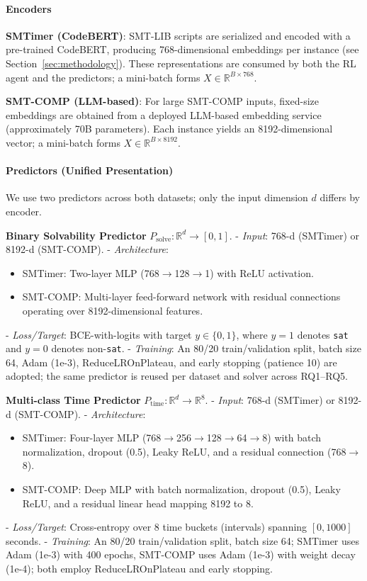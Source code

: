 \documentclass[acmsmall,screen,review,anonymous]{acmart}
\begin{document}
\paragraph{Encoders}
\textbf{SMTimer (CodeBERT)}: SMT-LIB scripts are serialized and encoded with a pre-trained CodeBERT, producing 768-dimensional embeddings per instance (see Section~\ref{sec:methodology}). These representations are consumed by both the RL agent and the predictors; a mini-batch forms $X\in\mathbb{R}^{B\times 768}$.

\textbf{SMT-COMP (LLM-based)}: For large SMT-COMP inputs, fixed-size embeddings are obtained from a deployed LLM-based embedding service (approximately 70B parameters). Each instance yields an 8192-dimensional vector; a mini-batch forms $X\in\mathbb{R}^{B\times 8192}$.

\paragraph{Predictors (Unified Presentation)}
We use two predictors across both datasets; only the input dimension $d$ differs by encoder.

\textbf{Binary Solvability Predictor} $P_{\text{solve}}: \mathbb{R}^{d}\to[0,1]$.
- \textit{Input}: 768-d (SMTimer) or 8192-d (SMT-COMP).
- \textit{Architecture}: 
  \begin{itemize}
  \item SMTimer: Two-layer MLP (768$\to$128$\to$1) with ReLU activation.
  \item SMT-COMP: Multi-layer feed-forward network with residual connections operating over 8192-dimensional features.
  \end{itemize}
- \textit{Loss/Target}: BCE-with-logits with target $y\in\{0,1\}$, where $y=1$ denotes \texttt{sat} and $y=0$ denotes non-\texttt{sat}.
- \textit{Training}: An 80/20 train/validation split, batch size 64, Adam (1e-3), ReduceLROnPlateau, and early stopping (patience 10) are adopted; the same predictor is reused per dataset and solver across RQ1--RQ5.

\textbf{Multi-class Time Predictor} $P_{\text{time}}: \mathbb{R}^{d}\to\mathbb{R}^{8}$.
- \textit{Input}: 768-d (SMTimer) or 8192-d (SMT-COMP).
- \textit{Architecture}: 
  \begin{itemize}
  \item SMTimer: Four-layer MLP (768$\to$256$\to$128$\to$64$\to$8) with batch normalization, dropout (0.5), Leaky ReLU, and a residual connection (768$\to$8).
  \item SMT-COMP: Deep MLP with batch normalization, dropout (0.5), Leaky ReLU, and a residual linear head mapping 8192 to 8.
  \end{itemize}
- \textit{Loss/Target}: Cross-entropy over 8 time buckets (intervals) spanning $[0,1000]$ seconds.
- \textit{Training}: An 80/20 train/validation split, batch size 64; SMTimer uses Adam (1e-3) with 400 epochs, SMT-COMP uses Adam (1e-3) with weight decay (1e-4); both employ ReduceLROnPlateau and early stopping.
\end{document}
